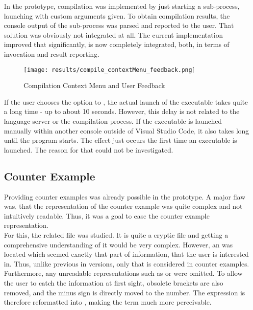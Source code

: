 In the prototype, compilation was implemented by just starting a sub-process, launching  with custom arguments given.
To obtain compilation results, the console output of the sub-process was parsed and reported to the user.
That solution was obviously not integrated at all.
The current implementation improved that significantly, is now completely integrated, both, in terms of invocation and result reporting.

\begin{figure}[h]
    \centering
    \texttt{[image: results/compile\_contextMenu\_feedback.png]}
    \caption{Compilation Context Menu and User Feedback}
    \label{fig:compilation_stuff}
\end{figure}


If the user chooses the option to , the actual launch of the executable takes quite a long time - up to about 10 seconds.
However, this delay is not related to the language server or the compilation process.
If the executable is launched manually within another console outside of Visual Studio Code, it also takes long until the program starts.
The effect just occurs the first time an executable is launched.
The reason for that could not be investigated.

\subsection{Counter Example}
Providing counter examples was already possible in the prototype.
A major flaw was, that the representation of the counter example was quite complex and not intuitively readable.
Thus, it was a goal to ease the counter example representation.\\

For this, the related  file was studied.
It is quite a  cryptic file and getting a comprehensive understanding of it would be very complex.
However, an  was located which seemed exactly that part of information, that the user is interested in.
Thus, unlike previous in versions, only that  is considered in counter examples.
Furthermore, any unreadable representations such as  or  were omitted.
To allow the user to catch the information at first sight, obsolete brackets are also removed, and the minus sign is directly moved to the number.
The expression  is therefore reformatted into , making the term much more perceivable.

